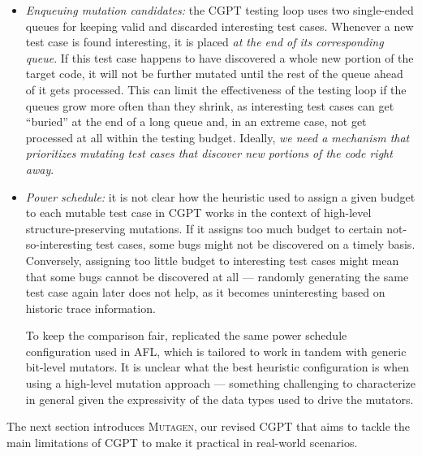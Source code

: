 \documentclass[sigconf,review,anonymous]{acmart}
\newcommand{\mutagen}{\textsc{Mutagen}\xspace}
\begin{document}
\begin{itemize}
\item \emph{Enqueuing mutation candidates:}
%
the CGPT testing loop uses two single-ended queues for keeping valid and
discarded interesting test cases.
%
Whenever a new test case is found interesting, it is placed \emph{at the end of
  its corresponding queue}.
%
If this test case happens to have discovered a whole new portion of the target
code, it will not be further mutated until the rest of the queue ahead of it
gets processed.
%
This can limit the effectiveness of the testing loop if the queues grow more
often than they shrink, as interesting test cases can get ``buried'' at the end
of a long queue and,
%
%
in an extreme case, not get processed at all within the testing budget.
%
Ideally, \emph{we need a mechanism that prioritizes mutating test cases that
  discover new portions of the code right away}.
%
%

\item \emph{Power schedule:}
%
it is not clear how the heuristic used to assign a given budget to each mutable
test case in CGPT works in the context of high-level structure-preserving
mutations.
%
If it assigns too much budget to certain not-so-interesting test cases, some
bugs might not be discovered on a timely basis.
%
Conversely, assigning too little budget to interesting test cases might mean
that some bugs cannot be discovered at all --- randomly generating the same test
case again later does not help, as it becomes uninteresting based on historic
trace information.

To keep the comparison fair, \citeauthor{lampropoulos2019coverage} replicated
the same power schedule configuration used in AFL, which is tailored to work in
tandem with generic bit-level mutators.
%
It is unclear what the best heuristic configuration is when using a high-level
mutation approach --- something challenging to characterize in general given the
expressivity of the data types used to drive the mutators.
\end{itemize}

The next section introduces \mutagen, our revised CGPT that aims to tackle the
main limitations of CGPT to make it practical in real-world scenarios.

\end{document}
